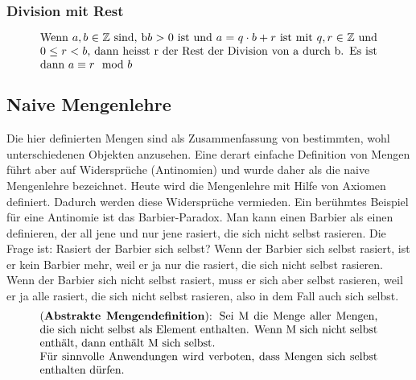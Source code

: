 \subsubsection{Division mit Rest}
\begin{equation}
    \parbox{30em}{Wenn \(a,b \in \mathbb{Z}\) sind, b\(b>0\) ist und \(a=q \cdot b + r\) ist mit \(q,r \in \mathbb{Z}\) und 
    \(0 \leq r < b\), dann heisst r der Rest der Division von a durch b. Es ist dann 
    \(a \equiv r \mod b\)}
\end{equation}

\subsection{Naive Mengenlehre}
Die hier definierten Mengen sind als Zusammenfassung von bestimmten, wohl unterschiedenen Objekten anzusehen. Eine derart einfache Definition von Mengen führt aber auf 
Widersprüche (Antinomien) und wurde daher als die naive Mengenlehre bezeichnet. 
Heute wird die Mengenlehre mit Hilfe von Axiomen definiert. Dadurch werden diese Widersprüche vermieden. Ein berühmtes Beispiel für eine Antinomie ist das Barbier-Paradox.
Man kann einen Barbier als einen definieren, der all jene und nur jene rasiert, die sich nicht selbst rasieren. Die Frage ist: 
Rasiert der Barbier sich selbst? Wenn der Barbier sich selbst rasiert, ist er kein Barbier mehr, weil er ja nur die 
rasiert, die sich nicht selbst rasieren. Wenn der Barbier sich nicht selbst rasiert, muss er sich aber selbst rasieren, weil 
er ja alle rasiert, die sich nicht selbst rasieren, also in dem Fall auch sich selbst.
\begin{equation}
    \parbox{30em}{(\textbf{Abstrakte Mengendefinition}): Sei M die Menge aller Mengen, die 
    sich nicht selbst als Element enthalten. Wenn M sich nicht selbst enthält, dann enthält M
    sich selbst. \\ Für sinnvolle Anwendungen wird verboten, dass Mengen sich selbst enthalten dürfen.}
\end{equation}

